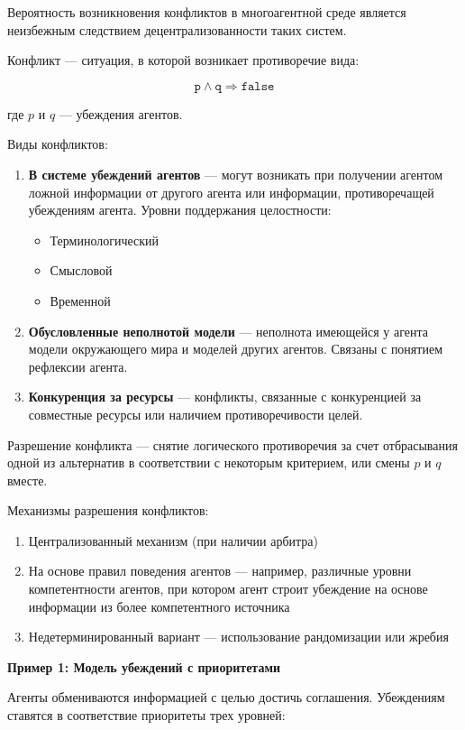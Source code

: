 Вероятность возникновения конфликтов в многоагентной среде является неизбежным следствием децентрализованности таких систем.

Конфликт — ситуация, в которой возникает противоречие вида:

\[ \texttt{p} \wedge \texttt{q} \Rightarrow \texttt{false} \]

где $p$ и $q$ — убеждения агентов.

Виды конфликтов:

\begin{enumerate}
  \item \textbf{В системе убеждений агентов} — могут возникать при получении агентом ложной информации от другого агента или информации, противоречащей убеждениям агента. Уровни поддержания целостности:
    \begin{itemize}
      \item Терминологический
      \item Смысловой
      \item Временной
    \end{itemize}
  \item \textbf{Обусловленные неполнотой модели} — неполнота имеющейся у агента модели окружающего мира и моделей других агентов. Связаны с понятием рефлексии агента.
  \item \textbf{Конкуренция за ресурсы} — конфликты, связанные с конкуренцией за совместные ресурсы или наличием противоречивости целей.
\end{enumerate}

Разрешение конфликта — снятие логического противоречия за счет отбрасывания одной из альтернатив в соответствии с некоторым критерием, или смены $p$ и $q$ вместе.

Механизмы разрешения конфликтов:

\begin{enumerate}
  \item Централизованный механизм (при наличии арбитра)
  \item На основе правил поведения агентов — например, различные уровни компетентности агентов, при котором агент строит убеждение на основе информации из более компетентного источника
  \item Недетерминированный вариант — использование рандомизации или жребия
\end{enumerate}

\textbf{Пример 1: Модель убеждений с приоритетами}

Агенты обмениваются информацией с целью достичь соглашения. Убеждениям ставятся в соответствие приоритеты трех уровней:

